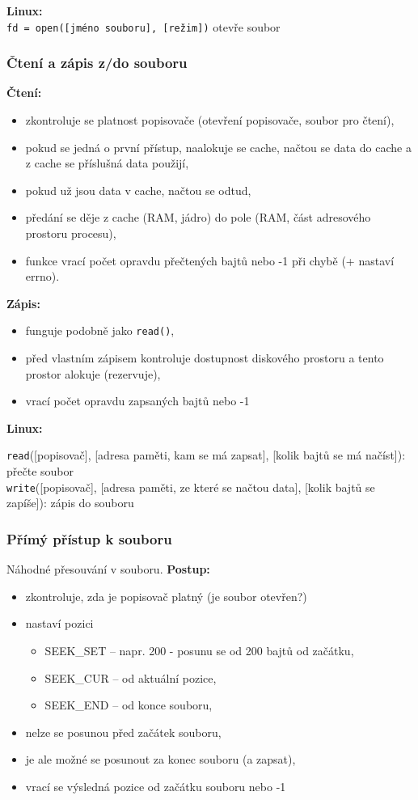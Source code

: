 \documentclass[a4paper, 11pt]{article}
\newcommand{\tcmd}[1]{\texttt{#1}}
\begin{document}
\textbf{Linux:} \\
\tcmd{fd = open([jméno souboru], [režim])} otevře soubor

\subsubsection{Čtení a zápis z/do souboru}
\textbf{Čtení:}
\begin{itemize}
    \item zkontroluje se platnost popisovače (otevření popisovače, soubor pro čtení),
    \item pokud se jedná o první přístup, naalokuje se cache, načtou se data do cache a z cache se příslušná data použijí,
    \item pokud už jsou data v cache, načtou se odtud,
    \item předání se děje z cache (RAM, jádro) do pole (RAM, část adresového prostoru procesu),
    \item funkce vrací počet opravdu přečtených bajtů nebo -1 při chybě (+ nastaví errno).
\end{itemize}

\textbf{Zápis:}
\begin{itemize}
    \item funguje podobně jako \tcmd{read()},
    \item před vlastním zápisem kontroluje dostupnost diskového prostoru a tento prostor alokuje (rezervuje),
    \item vrací počet opravdu zapsaných bajtů nebo -1
\end{itemize}
 
\textbf{Linux:}

\tcmd{read}([popisovač], [adresa paměti, kam se má zapsat], [kolik bajtů se má načíst]): přečte soubor \\[0.2em]
\tcmd{write}([popisovač], [adresa paměti, ze které se načtou data], [kolik bajtů se zapíše]): zápis do souboru
 
\subsubsection{Přímý přístup k souboru}
Náhodné přesouvání v souboru. \textbf{Postup:}
\begin{itemize}
    \item zkontroluje, zda je popisovač platný (je soubor otevřen?)
    \item nastaví pozici
    \begin{itemize}
        \item SEEK\_SET -- napr. 200 - posunu se od 200 bajtů od začátku,
        \item SEEK\_CUR -- od aktuální pozice,
        \item SEEK\_END -- od konce souboru,
    \end{itemize}
    \item nelze se posunou před začátek souboru,
    \item je ale možné se posunout za konec souboru (a zapsat),
    \item vrací se výsledná pozice od začátku souboru nebo -1
\end{itemize}
 
\end{document}
